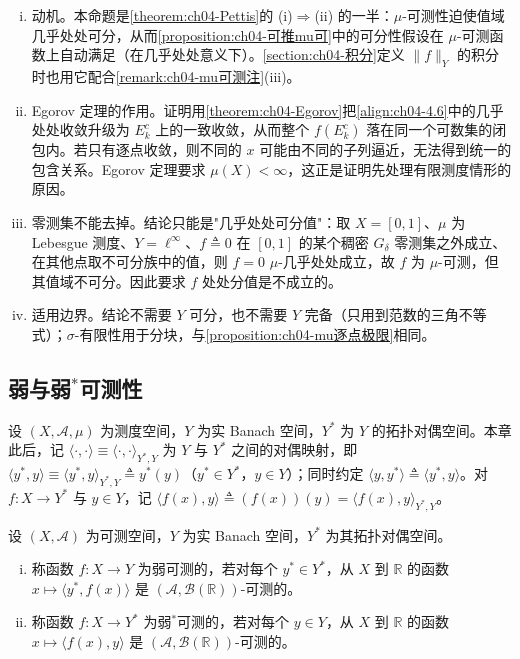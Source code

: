 \documentclass[../../main.tex]{subfiles}%
\begin{document}
\begin{remark}\label{remark:ch04-mu可推可分值动机}
\begin{enumerate}[(i)]
\item 动机。本命题是\cref{theorem:ch04-Pettis}的 (i)$\Rightarrow$(ii) 的一半：$\mu$-可测性迫使值域几乎处处可分，从而\cref{proposition:ch04-可推mu可}中的可分性假设在 $\mu$-可测函数上自动满足（在几乎处处意义下）。\cref{section:ch04-积分}定义 $\|f\|_Y$ 的积分时也用它配合\cref{remark:ch04-mu可测注}(iii)。
\item Egorov 定理的作用。证明用\cref{theorem:ch04-Egorov}把\eqref{align:ch04-4.6}中的几乎处处收敛升级为 $E_k^c$ 上的一致收敛，从而整个 $f(E_k^c)$ 落在同一个可数集的闭包内。若只有逐点收敛，则不同的 $x$ 可能由不同的子列逼近，无法得到统一的包含关系。Egorov 定理要求 $\mu(X)<\infty$，这正是证明先处理有限测度情形的原因。
\item 零测集不能去掉。结论只能是"几乎处处可分值"：取 $X=[0,1]$、$\mu$ 为 Lebesgue 测度、$Y=\ell^\infty$、$f\triangleq0$ 在 $[0,1]$ 的某个稠密 $G_\delta$ 零测集之外成立、在其他点取不可分族中的值，则 $f=0$ $\mu$-几乎处处成立，故 $f$ 为 $\mu$-可测，但其值域不可分。因此要求 $f$ 处处分值是不成立的。
\item 适用边界。结论不需要 $Y$ 可分，也不需要 $Y$ 完备（只用到范数的三角不等式）；$\sigma$-有限性用于分块，与\cref{proposition:ch04-mu逐点极限}相同。
\end{enumerate}
\end{remark}
\subsection{弱与弱$^*$可测性}\label{subsection:ch04-弱可测性}

设 $(X,\mathcal{A},\mu)$ 为测度空间，$Y$ 为实 Banach 空间，$Y^*$ 为 $Y$ 的拓扑对偶空间。本章此后，记 $\langle\cdot,\cdot\rangle\equiv\langle\cdot,\cdot\rangle_{Y^*,Y}$ 为 $Y$ 与 $Y^*$ 之间的对偶映射，即 $\langle y^*,y\rangle\equiv\langle y^*,y\rangle_{Y^*,Y}\triangleq y^*(y)$（$y^*\in Y^*$，$y\in Y$）；同时约定 $\langle y,y^*\rangle\triangleq\langle y^*,y\rangle$。对 $f:X\to Y^*$ 与 $y\in Y$，记 $\langle f(x),y\rangle\triangleq(f(x))(y)=\langle f(x),y\rangle_{Y^*,Y}$。

\begin{definition}\label{definition:ch04-弱可测}\label{definition:ch04-弱星可测}
设 $(X,\mathcal{A})$ 为可测空间，$Y$ 为实 Banach 空间，$Y^*$ 为其拓扑对偶空间。
\begin{enumerate}[(i)]
\item 称函数 $f:X\to Y$ 为弱可测的，若对每个 $y^*\in Y^*$，从 $X$ 到 $\mathbb{R}$ 的函数 $x\mapsto\langle y^*,f(x)\rangle$ 是 $(\mathcal{A},\mathcal{B}(\mathbb{R}))$-可测的。
\item 称函数 $f:X\to Y^*$ 为弱$^*$可测的，若对每个 $y\in Y$，从 $X$ 到 $\mathbb{R}$ 的函数 $x\mapsto\langle f(x),y\rangle$ 是 $(\mathcal{A},\mathcal{B}(\mathbb{R}))$-可测的。
\end{enumerate}
\end{definition}
\end{document}
